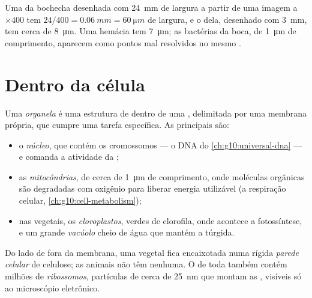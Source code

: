 \begin{example}\label{ex:g10:cells-common-unit:cheek}
Uma  da bochecha desenhada com \qty{24}{mm} de largura a partir
de uma imagem a $\times 400$ tem $24/400 = \qty{0.06}{mm} = \qty{60}{\micro m}$
de largura, e o  dela, desenhado com \qty{3}{mm}, tem cerca de
\qty{8}{\micro m}. Uma hemácia tem \qty{7}{\micro m}; as bactérias da
boca, de \qty{1}{\micro m} de comprimento, aparecem como pontos mal
resolvidos no mesmo .
\end{example}

\section{Dentro da célula}

\begin{definition}[Organela]\label{def:g10:cells-common-unit:organelle}
Uma \emph{organela} é uma estrutura de dentro de uma
, delimitada por uma membrana própria, que cumpre uma tarefa
específica. As principais são:
\begin{itemize}
  \item o \emph{núcleo}, que contém os cromossomos --- o
        DNA do \cref{ch:g10:universal-dna} --- e comanda a atividade da
        ;
  \item as \emph{mitocôndrias}, de cerca de
        \qty{1}{\micro m} de comprimento, onde moléculas orgânicas são
        degradadas com oxigênio para liberar energia utilizável (a
        respiração celular, \cref{ch:g10:cell-metabolism});
  \item nas  vegetais, os \emph{cloroplastos},
        verdes de clorofila, onde acontece a fotossíntese, e um grande
        \emph{vacúolo} cheio de água que mantém a 
        túrgida.
\end{itemize}
Do lado de fora da membrana, uma  vegetal fica encaixotada numa
rígida \emph{parede celular} de celulose; as
 animais não têm nenhuma. O  de toda  também
contém milhões de \emph{ribossomos}, partículas de
cerca de \qty{25}{nm} que montam as , visíveis só ao
microscópio eletrônico.
\end{definition}

